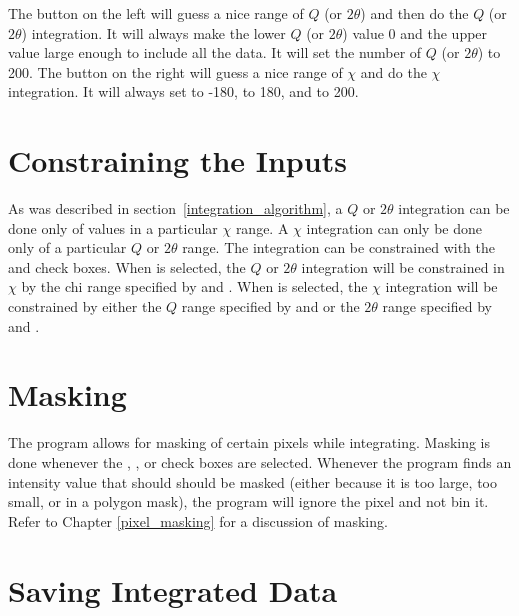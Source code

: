 The  button 
on the left will guess a nice range of $Q$ 
(or $2\theta$) and then do the $Q$ (or
$2\theta$) integration.
It will always make the lower $Q$ (or $2\theta$)
value 0 and the upper value large enough
to include all the data.
It will set the number of $Q$ (or $2\theta$) to
200. The  button on the right 
will guess a nice range of $\chi$ and 
do the $\chi$ integration. It will always 
set  to -180,  to
180, and  to 200.

\section{Constraining the Inputs}

As was described in 
section~\ref{integration_algorithm}, a $Q$ or $2\theta$ 
integration can be done only of values in a 
particular $\chi$ range. A $\chi$ integration 
can only be done only of a particular $Q$ or $2\theta$ 
range. 
The integration can be constrained with the 
 and 
 check boxes.
When  is
selected,
the $Q$ or $2\theta$ integration 
will be constrained in $\chi$ by the chi
range specified by  and 
. When 
 is selected, 
the $\chi$ integration will be constrained by
either the $Q$ range specified by 
and  or the $2\theta$ range specified by 
 and .

\section{Masking}

The program allows for masking of certain
pixels while integrating. Masking is done whenever the
, ,
or  check boxes are selected.
Whenever the program finds an intensity value
that should should be masked (either because it 
is too large, too small, or in a polygon mask), the
program will ignore the pixel and not bin it.
Refer to Chapter \ref{pixel_masking} for a discussion
of masking.

\section{Saving Integrated Data}

